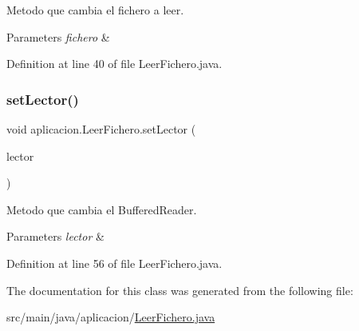 Metodo que cambia el fichero a leer. 
\begin{DoxyParams}{Parameters}
{\em fichero} & \\
\hline
\end{DoxyParams}


Definition at line 40 of file Leer\+Fichero.\+java.

\hypertarget{classaplicacion_1_1_leer_fichero_aa4bde84f5a2616e197367dcb1d14bc77}{}\label{classaplicacion_1_1_leer_fichero_aa4bde84f5a2616e197367dcb1d14bc77} 
\subsubsection{\texorpdfstring{set\+Lector()}{setLector()}}
{\footnotesize\ttfamily void aplicacion.\+Leer\+Fichero.\+set\+Lector (\begin{DoxyParamCaption}\item[{Buffered\+Reader}]{lector }\end{DoxyParamCaption})}

Metodo que cambia el Buffered\+Reader. 
\begin{DoxyParams}{Parameters}
{\em lector} & \\
\hline
\end{DoxyParams}


Definition at line 56 of file Leer\+Fichero.\+java.



The documentation for this class was generated from the following file\+:\begin{DoxyCompactItemize}
\item 
src/main/java/aplicacion/\hyperlink{_leer_fichero_8java}{Leer\+Fichero.\+java}\end{DoxyCompactItemize}
